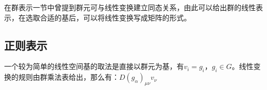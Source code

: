 \begin{issues}
\issueDraft
\end{issues}
在群表示一节中曾提到群元可与线性变换建立同态关系，由此可以给出群的线性表示，在选取合适的基后，可以将线性变换写成矩阵的形式。

\subsection{正则表示}

一个较为简单的线性空间基的取法是直接以群元为基，有$v_i=g_i$，$g_i \in G$。线性变换的规则由群乘法表给出，那么有：$D(g_\alpha)_{\mu\nu}v_\nu$

